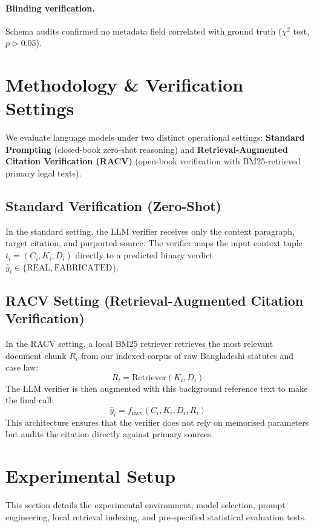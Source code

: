 \documentclass[conference]{IEEEtran}
\begin{document}
\paragraph{Blinding verification.} Schema audits confirmed no metadata field correlated with ground truth ($\chi^2$ test, $p > 0.05$).

\section{Methodology \& Verification Settings}
We evaluate language models under two distinct operational settings: \textbf{Standard Prompting} (closed-book zero-shot reasoning) and \textbf{Retrieval-Augmented Citation Verification (RACV)} (open-book verification with BM25-retrieved primary legal texts).

\subsection{Standard Verification (Zero-Shot)}
In the standard setting, the LLM verifier receives only the context paragraph, target citation, and purported source. The verifier maps the input context tuple $t_i = (C_i, K_i, D_i)$ directly to a predicted binary verdict $\hat{y}_i \in \{\text{REAL}, \text{FABRICATED}\}$.

\subsection{RACV Setting (Retrieval-Augmented Citation Verification)}
In the RACV setting, a local BM25 retriever \cite{bm25} retrieves the most relevant document chunk $R_i$ from our indexed corpus of raw Bangladeshi statutes and case law:
\begin{equation}
R_i = \text{Retriever}(K_i, D_i)
\end{equation}
The LLM verifier is then augmented with this background reference text to make the final call:
\begin{equation}
\hat{y}_i = f_{\text{racv}}(C_i, K_i, D_i, R_i)
\end{equation}
This architecture ensures that the verifier does not rely on memorised parameters but audits the citation directly against primary sources.

\section{Experimental Setup}
This section details the experimental environment, model selection, prompt engineering, local retrieval indexing, and pre-specified statistical evaluation tests.
\end{document}
